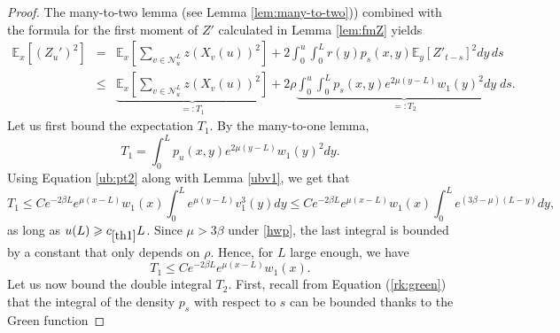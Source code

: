 \documentclass[11pt]{article}
\theoremstyle{plain}
\newcommand\linf{\lambda_1^\infty}
\begin{document}
\begin{proof}
The many-to-two lemma (see Lemma \ref{lem:many-to-two})) combined with the formula for the first moment of $Z'$ calculated in Lemma \ref{lem:fmZ} yields
\begin{eqnarray}
\mathbb{E}_x[(Z_u')^2]&=&\mathbb{E}_x\left[\sum_{v\in\mathcal{N}_u^L}z(X_v (u))^2\right]+2\int_0^u\int_0^L r(y)p_s(x,y)\mathbb{E}_y[Z'_{t-s}]^2dy\, ds\nonumber\\
&\leqslant&\underbrace{\mathbb{E}_x\left[\sum_{v\in\mathcal{N}_u^L}z(X_v (u))^2\right]}_{\textstyle=:T_1}+2\rho\underbrace{\int_0^u\int_0^L p_s(x,y)e^{2\mu(y-L)}w_1(y)^2dy \;ds}_{\textstyle=:T_2}.
\label{manyto2}
\end{eqnarray}
Let us first bound the expectation $T_1$. By the many-to-one lemma,
\begin{equation*}
T_1=\int_0^Lp_u(x,y)e^{2 \mu (y-L)}w_1(y)^2dy.
\end{equation*}
Using Equation \eqref{ub:pt2} along with Lemma \ref{ubv1}, we get that 
\begin{equation}
T_1\leqslant Ce^{-2\beta L}e^{\mu (x-L)}w_1(x)\int_0^L e^{\mu(y-L)}v_1^3(y)dy \leqslant  Ce^{-2\beta L}e^{\mu (x-L)}w_1(x)\int_0^Le^{(3\beta-\mu)(L-y)}dy,
    \end{equation}
as long as $u(L)\geqslant c_{\ref{th1}}L$.  Since  $\mu>3\beta$ under \eqref{hwp}, the last integral is bounded by a constant that only depends on $\rho$. Hence, for $L$ large enough, we have 
\begin{equation}\label{ub:T1}
T_1\leqslant Ce^{-2\beta L}e^{\mu(x-L)}w_1(x).
\end{equation}
Let us now bound the double integral $T_2$. First, recall from Equation (\ref{rk:green}) that the integral of the density $p_s$ with respect to $s$ can be bounded thanks to the Green function

\end{proof}
\end{document}
